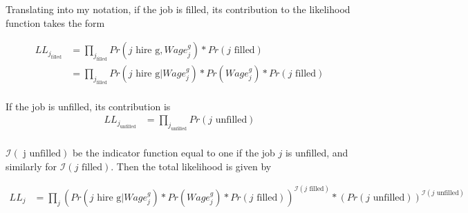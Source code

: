 \documentclass[12pt]{article}
\begin{document}
Translating into my notation, if the job is filled, its contribution to the likelihood function takes the form 


\begin{align*}
 LL_{j_{\text{filled}}} &= \prod_{j_{\text{filled}}}  Pr(\text{$j$ hire g},Wage^g_{j})*Pr(\text{$j$ filled}) \\
  &=  \prod_{j_{\text{filled}}}  Pr(\text{$j$ hire g} | Wage^g_{j})*Pr(Wage^g_{j})*Pr( \text{$j$ filled}) \\
\end{align*}

If the job is unfilled, its contribution is
\begin{align*}
 LL_{j_{\text{unfilled}}} &= \prod_{j_{\text{unfilled}}}  Pr(\text{$j$ unfilled}) \\
\end{align*}

$\mathcal{I}( \text{ j unfilled})$ be the indicator function equal to one if the job $j$ is unfilled, and similarly for $\mathcal{I}(\text{$j$ filled})$. Then the total likelihood is given by

\begin{align*}
LL_j  &=  \prod_j ( Pr(\text{$j$ hire g} | Wage^g_{j})*Pr(Wage^g_{j})*Pr( \text{$j$ filled}))^{\mathcal{I}(\text{$j$ filled})}*(Pr(\text{$j$ unfilled}))^{\mathcal{I}(\text{$j$ unfilled})}  \\
\end{align*}
\end{document}

